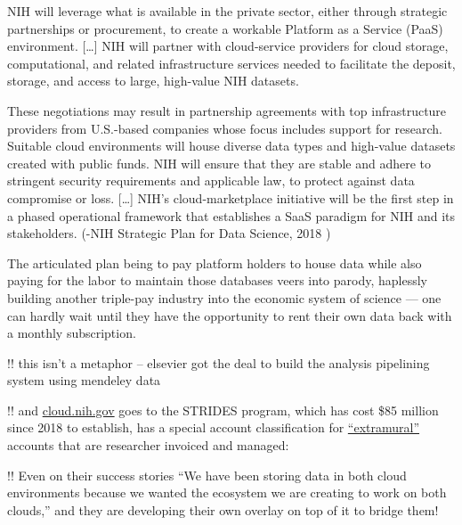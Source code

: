 \documentclass[11pt]{article}
\begin{document}
\begin{multicols}{2}
\begin{leftbar}
NIH will leverage what is available in the private sector, either
through strategic partnerships or procurement, to create a workable
Platform as a Service (PaaS) environment. {[}\ldots{]} NIH will partner
with cloud-service providers for cloud storage, computational, and
related infrastructure services needed to facilitate the deposit,
storage, and access to large, high-value NIH datasets.

These negotiations may result in partnership agreements with top
infrastructure providers from U.S.-based companies whose focus includes
support for research. Suitable cloud environments will house diverse
data types and high-value datasets created with public funds. NIH will
ensure that they are stable and adhere to stringent security
requirements and applicable law, to protect against data compromise or
loss. {[}\ldots{]} NIH's cloud-marketplace initiative will be the first
step in a phased operational framework that establishes a SaaS paradigm
for NIH and its stakeholders. (-NIH Strategic Plan for Data Science,
2018 \cite{NIHStrategicPlan2018} )
\end{leftbar}

The articulated plan being to pay platform holders to house data while
also paying for the labor to maintain those databases veers into parody,
haplessly building another triple-pay industry \cite{buranyiStaggeringlyProfitableBusiness2017}  into the economic system
of science --- one can hardly wait until they have the opportunity to
rent their own data back with a monthly subscription.

!! this isn't a metaphor -- elsevier got the deal to build the analysis
pipelining system using mendeley data \cite{ElsevierSevenBridges2017} 

!! and
\href{https://web.archive.org/web/20210729131920/https://cloud.nih.gov/}{cloud.nih.gov}
goes to the STRIDES program, which has cost \$85 million since 2018 to
establish, has a special account classification for
\href{https://web.archive.org/web/20211006003547/https://cloud.nih.gov/enrollment/account-type/}{``extramural''}
accounts that are researcher invoiced and managed:\\
\cite{reillyNIHSTRIDESInitiative2021} 

!! Even on their success stories ``We have been storing data in both
cloud environments because we wanted the ecosystem we are creating to
work on both clouds,'' and they are developing their own overlay on top
of it to bridge them! \cite{STRIDESInitiativeSuccess2020} 


\end{multicols}
\end{document}
